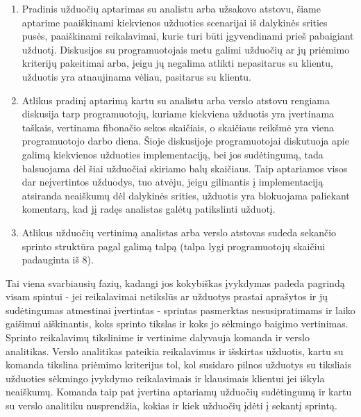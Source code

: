 \documentclass{VUMIFPSkursinis}
\begin{document}
\begin{enumerate}
	\item Pradinis užduočių aptarimas su analistu arba užsakovo atstovu, šiame aptarime paaiškinami kiekvienos užduoties scenarijai iš dalykinės srities pusės, paaiškinami reikalavimai, kurie turi būti įgyvendinami prieš pabaigiant užduotį. Diskusijos su programuotojais metu galimi užduočių ar jų priėmimo kriterijų pakeitimai arba, jeigu jų negalima atlikti nepasitarus su klientu, užduotis yra atnaujinama vėliau, pasitarus su klientu.
	\item Atlikus pradinį aptarimą kartu su analistu arba verslo atstovu rengiama diskusija tarp programuotojų, kuriame kiekviena užduotis yra įvertinama taškais, vertinama fibonačio sekos skaičiais, o skaičiaus reikšmė yra viena programuotojo darbo diena. Šioje diskusijoje programuotojai diskutuoja apie galimą kiekvienos užduoties implementaciją, bei jos sudėtingumą, tada balsuojama dėl šiai užduočiai skiriamo balų skaičiaus. Taip aptariamos visos dar neįvertintos užduodys, tuo atvėju, jeigu gilinantis į implementaciją atsiranda neaiškumų dėl dalykinės srities, užduotis yra blokuojama paliekant komentarą, kad jį radęs analistas galėtų patikslinti užduotį.
	\item Atlikus užduočių vertinimą analistas arba verslo atstovas sudeda sekančio sprinto struktūra pagal galimą talpą (talpa lygi programuotojų skaičiui padauginta iš 8). 
\end{enumerate}
	Tai viena svarbiausių fazių, kadangi jos kokybiškas įvykdymas padeda pagrindą visam spintui -  jei reikalavimai netikslūs ar užduotys prastai aprašytos ir jų sudėtingumas atmestinai įvertintas - sprintas pasmerktas nesusipratimams ir laiko gaišimui aiškinantis, koks sprinto tikslas ir koks jo sėkmingo baigimo vertinimas. Sprinto reikalavimų tikslinime ir vertinime dalyvauja komanda ir verslo analitikas. Verslo analitikas pateikia reikalavimus ir išskirtas užduotis, kartu su komanda tikslina priėmimo kriterijus tol, kol susidaro pilnos užduotys su tiksliais užduoties sėkmingo įvykdymo reikalavimais ir klausimais klientui jei iškyla neaiškumų. Komanda taip pat įvertina aptariamų užduočių sudėtingumą ir kartu su verslo analitiku nusprendžia, kokias ir kiek užduočių įdėti į sekantį sprintą.
\end{document}
